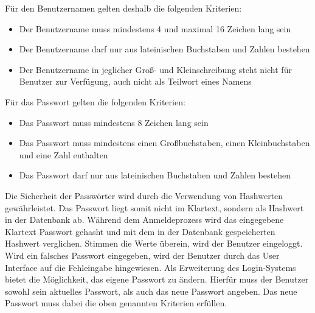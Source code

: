 \noindent{}Für den Benutzernamen gelten deshalb die folgenden Kriterien:
\begin{itemize}
  \item Der Benutzername muss mindestens 4 und maximal 16 Zeichen lang sein
  \item Der Benutzername darf nur aus lateinischen Buchstaben und Zahlen bestehen
  \item Der Benutzername  in jeglicher Groß- und Kleinschreibung steht nicht für Benutzer zur Verfügung, auch nicht als Teilwort eines Namens
\end{itemize}
Für das Passwort gelten die folgenden Kriterien:
\begin{itemize}
  \item Das Passwort muss mindestens 8 Zeichen lang sein
  \item Das Passwort muss mindestens einen Großbuchstaben, einen Kleinbuchstaben und eine Zahl enthalten
  \item Das Passwort darf nur aus lateinischen Buchstaben und Zahlen bestehen
\end{itemize} 
\noindent
Die Sicherheit der Passwörter wird durch die Verwendung von Hashwerten gewährleistet.
Das Passwort liegt somit nicht im Klartext, sondern als Hashwert in der Datenbank ab.
Während dem Anmeldeprozess wird das eingegebene Klartext Passwort gehasht und mit dem in der Datenbank gespeicherten Hashwert verglichen.
Stimmen die Werte überein, wird der Benutzer eingeloggt.
Wird ein falsches Passwort eingegeben, wird der Benutzer durch das User Interface auf die Fehleingabe hingewiesen.
\newparagraph
Als Erweiterung des Login-Systems bietet  die Möglichkeit, das eigene Passwort zu ändern.
Hierfür muss der Benutzer sowohl sein aktuelles Passwort, als auch das neue Passwort angeben.
Das neue Passwort muss dabei die oben genannten Kriterien erfüllen.

